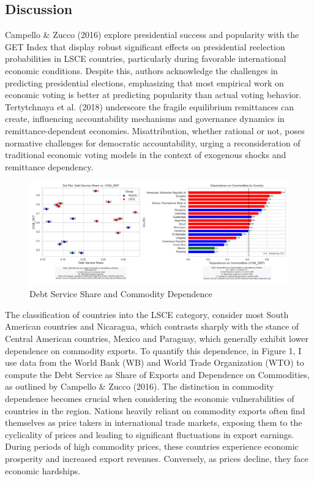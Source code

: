 \documentclass[
]{article}
\begin{document}
\hypertarget{discussion}{%
\subsection{Discussion}\label{discussion}}

Campello \& Zucco (2016) explore presidential success and popularity
with the GET Index that display robust significant effects on
presidential reelection probabilities in LSCE countries, particularly
during favorable international economic conditions. Despite this,
authors acknowledge the challenges in predicting presidential elections,
emphasizing that most empirical work on economic voting is better at
predicting popularity than actual voting behavior. Tertytchnaya et al.
(2018) underscore the fragile equilibrium remittances can create,
influencing accountability mechanisms and governance dynamics in
remittance-dependent economies. Misattribution, whether rational or not,
poses normative challenges for democratic accountability, urging a
reconsideration of traditional economic voting models in the context of
exogenous shocks and remittance dependency.

\begin{figure}
\hypertarget{fig:label}{%
\centering
\includegraphics[width=1\textwidth,height=1\textheight]{com_debt_latam.png}
\caption{Debt Service Share and Commodity Dependence}\label{fig:label}
}
\end{figure}

The classification of countries into the LSCE category, consider most
South American countries and Nicaragua, which contrasts sharply with the
stance of Central American countries, Mexico and Paraguay, which
generally exhibit lower dependence on commodity exports. To quantify
this dependence, in Figure 1, I use data from the World Bank (WB) and
World Trade Organization (WTO) to compute the Debt Service as Share of
Exports and Dependence on Commodities, as outlined by Campello \& Zucco
(2016). The distinction in commodity dependence becomes crucial when
considering the economic vulnerabilities of countries in the region.
Nations heavily reliant on commodity exports often find themselves as
price takers in international trade markets, exposing them to the
cyclicality of prices and leading to significant fluctuations in export
earnings. During periods of high commodity prices, these countries
experience economic prosperity and increased export revenues.
Conversely, as prices decline, they face economic hardships.
\end{document}
